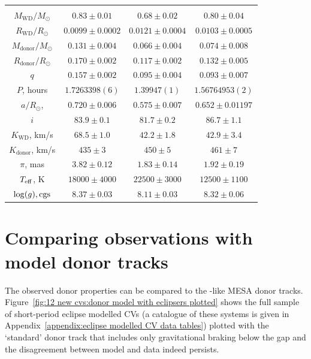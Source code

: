\begin{table}
\begin{tabular}{cccc}
        \hline \hline \\
        $M_\mathrm{WD}/M_\odot$     & $0.83\pm0.01$     & $0.68\pm0.02$          & $0.80\pm0.04$           \\
        $R_\mathrm{WD}/R_\odot$     & $0.0099\pm0.0002$ & $0.0121\pm0.0004$      & $0.0103\pm0.0005$       \\
        $M_\mathrm{donor}/M_\odot$  & $0.131\pm0.004$   & $0.066\pm0.004$        & $0.074\pm0.008$         \\
        $R_\mathrm{donor}/R_\odot$  & $0.170\pm0.002$   & $0.117\pm0.002$        & $0.132\pm0.005$         \\
        $q$                         & $0.157\pm0.002$   & $0.095\pm0.004$        & $0.093\pm0.007$         \\
        \hline
        $P$, hours                  & $1.7263398(6)$    & $1.39947(1)$           & $1.56764953(2)$         \\
        $a/R_\odot$,                & $0.720\pm0.006$   & $0.575\pm0.007$        & $0.652\pm0.01197$       \\
        $i$                         & $83.9\pm0.1$      & $81.7\pm0.2$           & $86.7\pm1.1$            \\
        $K_\mathrm{WD}$, km/s       & $68.5\pm1.0$      & $42.2\pm1.8$           & $42.9\pm3.4$            \\
        $K_\mathrm{donor}$, km/s    & $435\pm3$         & $450\pm5$              & $461\pm7$               \\
        \hline
        $\pi$, mas                  & $3.82\pm0.12$     & $1.83\pm0.14$          & $1.92\pm0.19$           \\
        $T_{\rm eff}$, K            & $18000\pm4000$    & $22500\pm3000$         & $12500\pm1100$          \\
        $\log(g), {\rm cgs}$        & $8.37\pm0.03$     & $8.11\pm0.03$          & $8.32\pm0.06$           \\
        \hline
        \hline
    \end{tabular}
\end{table}



\section{Comparing observations with model donor tracks}
\label{sect:12 new cvs:eclipse modelling of 12 CVs}

The observed donor properties can be compared to the \citet{knigge11}-like MESA donor tracks. Figure~\ref{fig:12 new cvs:donor model with eclipsers plotted} shows the full sample of short-period eclipse modelled CVs (a catalogue of these systems is given in Appendix~\ref{appendix:eclipse modelled CV data tables}) plotted with the `standard' donor track that includes only gravitational braking below the gap and the disagreement between model and data indeed persists.

